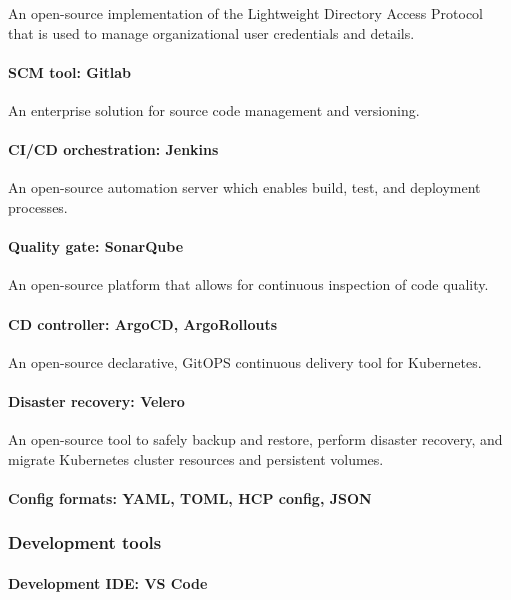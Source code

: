 An open-source implementation of the Lightweight Directory Access Protocol that is used to manage organizational user credentials and details. 

\paragraph{SCM tool: Gitlab }

An enterprise solution for source code management and versioning. 

\paragraph{CI/CD orchestration: Jenkins }

An open-source automation server which enables build, test, and deployment processes. 

\paragraph{Quality gate: SonarQube }

An open-source platform that allows for continuous inspection of code quality. 

\paragraph{CD controller: ArgoCD, ArgoRollouts }

An open-source declarative, GitOPS continuous delivery tool for Kubernetes. 

\paragraph{Disaster recovery: Velero }

An open-source tool to safely backup and restore, perform disaster recovery, and migrate Kubernetes cluster resources and persistent volumes. 

\paragraph{Config formats: YAML, TOML, HCP config, JSON }

\subsubsection{Development tools }

\paragraph{Development IDE: VS Code }

